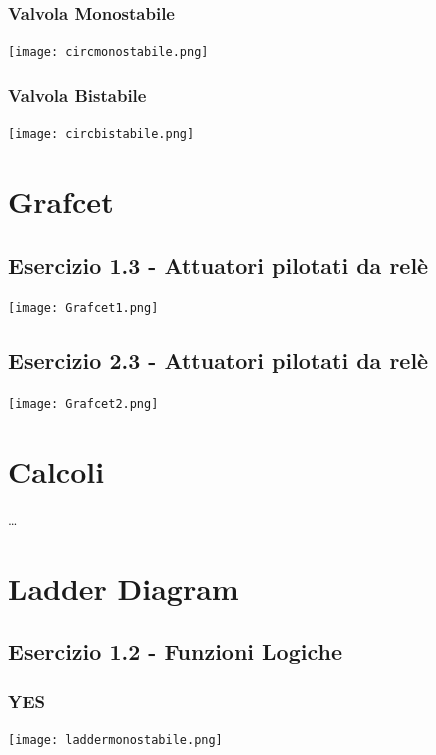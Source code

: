\documentclass[a4paper]{article}
\begin{document}
\subsubsection{Valvola Monostabile}
\begin{center}
\texttt{[image: circmonostabile.png]}
\end{center}

\subsubsection{Valvola Bistabile}
\begin{center}
\texttt{[image: circbistabile.png]}
\end{center}


\section{Grafcet}

\subsection{Esercizio 1.3 - Attuatori pilotati da relè}
\begin{center}
\texttt{[image: Grafcet1.png]}
\end{center}

\subsection{Esercizio 2.3 - Attuatori pilotati da relè}
\begin{center}
\texttt{[image: Grafcet2.png]}
\end{center}

\section{Calcoli}
\dots

\section{Ladder Diagram}

\subsection{Esercizio 1.2 - Funzioni Logiche}

\subsubsection{YES}
\begin{center}
\texttt{[image: laddermonostabile.png]}
\end{center}
\end{document}
